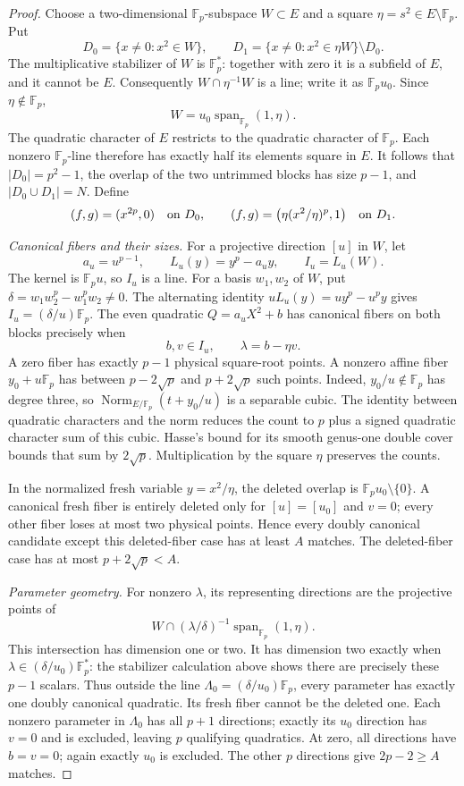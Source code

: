 \begin{proof}
Choose a two-dimensional $\mathbb F_p$-subspace $W\subset E$ and a
square $\eta=s^2\in E\setminus\mathbb F_p$. Put
\[
 D_0=\{x\ne0:x^2\in W\},\qquad
 D_1=\{x\ne0:x^2\in\eta W\}\setminus D_0.
\]
The multiplicative stabilizer of $W$ is $\mathbb F_p^*$: together
with zero it is a subfield of $E$, and it cannot be $E$.
Consequently $W\cap\eta^{-1}W$ is a line; write it as
$\mathbb F_pu_0$. Since $\eta\notin\mathbb F_p$,
\[
 W=u_0\operatorname{span}_{\mathbb F_p}(1,\eta).
\]
The quadratic character of $E$ restricts to the quadratic character
of $\mathbb F_p$. Each nonzero $\mathbb F_p$-line therefore has
exactly half its elements square in $E$. It follows that
$|D_0|=p^2-1$, the overlap of the two untrimmed blocks has size
$p-1$, and $|D_0\cup D_1|=N$.
Define
\[
 (f,g)=(x^{2p},0)\quad\hbox{on }D_0,\qquad
 (f,g)=\bigl(\eta(x^2/\eta)^p,1\bigr)\quad\hbox{on }D_1.
\]

\emph{Canonical fibers and their sizes.}
For a projective direction $[u]$ in $W$, let
\[
 a_u=u^{p-1},\qquad L_u(y)=y^p-a_uy,\qquad I_u=L_u(W).
\]
The kernel is $\mathbb F_pu$, so $I_u$ is a line. For a basis
$w_1,w_2$ of $W$, put $\delta=w_1w_2^p-w_1^pw_2\ne0$.
The alternating identity $uL_u(y)=uy^p-u^py$ gives
$I_u=(\delta/u)\mathbb F_p$.
The even quadratic $Q=a_uX^2+b$ has canonical fibers on both blocks
precisely when
\[
 b,v\in I_u,\qquad \lambda=b-\eta v.
\]
A zero fiber has exactly $p-1$ physical square-root points.
A nonzero affine fiber $y_0+u\mathbb F_p$ has between
$p-2\sqrt p$ and $p+2\sqrt p$ such points. Indeed,
$y_0/u\notin\mathbb F_p$ has degree three, so
$\operatorname{Norm}_{E/\mathbb F_p}(t+y_0/u)$ is a separable cubic.
The identity between quadratic characters and the norm reduces the
count to $p$ plus a signed quadratic character sum of this cubic.
Hasse's bound for its smooth genus-one double cover bounds that sum
by $2\sqrt p$. Multiplication by the square $\eta$ preserves the counts.

In the normalized fresh variable $y=x^2/\eta$, the deleted overlap
is $\mathbb F_pu_0\setminus\{0\}$. A canonical fresh fiber is
entirely deleted only for $[u]=[u_0]$ and $v=0$; every other fiber
loses at most two physical points. Hence every doubly canonical
candidate except this deleted-fiber case has at least $A$ matches.
The deleted-fiber case has at most $p+2\sqrt p<A$.

\emph{Parameter geometry.}
For nonzero $\lambda$, its representing directions are the projective
points of
\[
 W\cap(\lambda/\delta)^{-1}
          \operatorname{span}_{\mathbb F_p}(1,\eta).
\]
This intersection has dimension one or two. It has dimension two
exactly when $\lambda\in(\delta/u_0)\mathbb F_p^*$: the stabilizer
calculation above shows there are precisely these $p-1$ scalars.
Thus outside the line $\Lambda_0=(\delta/u_0)\mathbb F_p$, every
parameter has exactly one doubly canonical quadratic. Its fresh
fiber cannot be the deleted one. Each nonzero parameter in
$\Lambda_0$ has all $p+1$ directions; exactly its $u_0$ direction
has $v=0$ and is excluded, leaving $p$ qualifying quadratics.
At zero, all directions have $b=v=0$; again exactly $u_0$ is excluded.
The other $p$ directions give $2p-2\ge A$ matches.


\end{proof}
